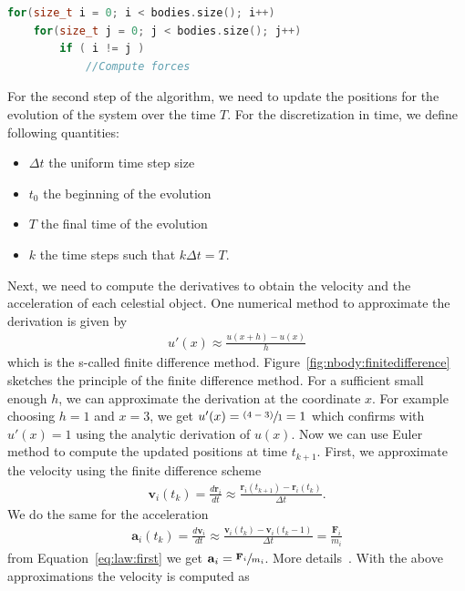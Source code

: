 \begin{lstlisting}[language=c++,caption={Example for the so-called direct sum\index{direct sum}.\label{code:directsum}},float,floatplacement=tb]
for(size_t i = 0; i < bodies.size(); i++)
	for(size_t j = 0; j < bodies.size(); j++)
		if ( i != j )
			//Compute forces
\end{lstlisting}

For the second step of the algorithm, we need to update the positions for the evolution of the system over the time $T$. For the discretization in time, we define following quantities:
\begin{itemize}
\item $\Delta t$ the uniform time step size
\item $t_0$ the beginning of the evolution
\item $T$ the final time of the evolution
\item $k$ the time steps such that $k\Delta t=T$.
\end{itemize}
Next, we need to compute the derivatives to obtain the velocity and the acceleration of each celestial object. One numerical method to approximate the derivation is given by
\begin{align}
u'(x) \approx \frac{u(x+h)-u(x)}{h}
\end{align}
which is the s-called finite difference method. Figure~\ref{fig:nbody:finitedifference} sketches the principle of the finite difference method. For a sufficient small enough $h$, we can approximate the derivation at the coordinate $x$. For example choosing $h=1$ and $x=3$, we get $u'(x)=\sfrac{(4-3)}{1}=1$ which confirms with $u'(x)=1$ using the analytic derivation of $u(x)$. Now we can use Euler method to compute the updated positions at time $t_{k+1}$. First, we approximate the velocity using the finite difference scheme
\begin{align}
\mathbf{v}_i(t_k) = \frac{d\mathbf{r}_i}{dt} \approx \frac{\mathbf{r}_i(t_{k+1})-\mathbf{r}_i(t_k)}{\Delta t}\label{eq:vel}\text{.}
\end{align}
We do the same for the acceleration
\begin{align}
\mathbf{a}_i(t_k) = \frac{d\mathbf{v}_i}{dt}   \approx  \frac{\mathbf{v}_i(t_k)-\mathbf{v}_i(t_k-1)}{\Delta t} = \frac{\mathbf{F}_i}{m_i}  \label{eq:acc} 
\end{align}
from Equation~\ref{eq:law:first} we get $\mathbf{a}_i=\sfrac{\mathbf{F}_i}{m_i}$. More details~\cite{strikwerda2004finite,leveque2007finite,euler1824institutionum}. With the above approximations the velocity is computed as
